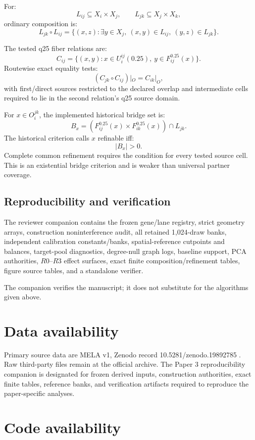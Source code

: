 \documentclass[11pt]{article}
\begin{document}
For:
\[
L_{ij}\subseteq X_i\times X_j,
\qquad
L_{jk}\subseteq X_j\times X_k,
\]
ordinary composition is:
\[
L_{jk}\circ L_{ij}
=
\{
(x,z):
\exists y\in X_j,\
(x,y)\in L_{ij},\
(y,z)\in L_{jk}
\}.
\]

The tested q25 fiber relations are:
\[
C_{ij}
=
\{
(x,y):
x\in U_i^{ij}(0.25),\
y\in F_{ij}^{0.25}(x)
\}.
\]
Routewise exact equality tests:
\[
(C_{jk}\circ C_{ij})|_O
=
C_{ik}|_O,
\]
with first/direct sources restricted to the declared overlap and intermediate cells required to lie in the second relation's q25 source domain.

For \(x\in O_i^{jk}\), the implemented historical bridge set is:
\[
B_x
=
(F_{ij}^{0.25}(x)\times F_{ik}^{0.25}(x))
\cap L_{jk}.
\]
The historical criterion calls \(x\) refinable iff:
\[
|B_x|>0.
\]
Complete common refinement requires the condition for every tested source cell. This is an existential bridge criterion and is weaker than universal partner coverage.

\subsection{Reproducibility and verification}

The reviewer companion contains the frozen gene/lane registry, strict geometry arrays, construction noninterference audit, all retained 1,024-draw banks, independent calibration constants/banks, spatial-reference cutpoints and balances, target-pool diagnostics, degree-null graph logs, baseline support, PCA authorities, \(R0\)--\(R3\) effect surfaces, exact finite composition/refinement tables, figure source tables, and a standalone verifier.

The companion verifies the manuscript; it does not substitute for the algorithms given above.

\FloatBarrier
\section{Data availability}

Primary source data are MELA v1, Zenodo record 10.5281/zenodo.19892785 \cite{Colgan2026}. Raw third-party files remain at the official archive. The Paper 3 reproducibility companion is designated for frozen derived inputs, construction authorities, exact finite tables, reference banks, and verification artifacts required to reproduce the paper-specific analyses.

\FloatBarrier
\section{Code availability}
\end{document}
